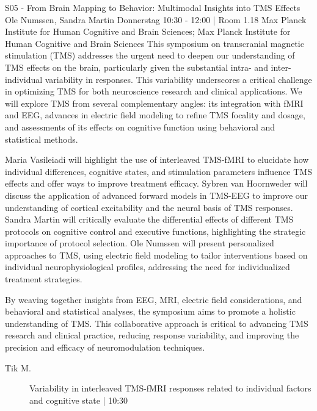 
            \begin{symposium}
            {S05 - From Brain Mapping to Behavior: Multimodal Insights into TMS Effects}
            { Ole Numssen, Sandra Martin}
            {Donnerstag 10:30 - 12:00 | Room 1.18}
            {Max Planck Institute for Human Cognitive and Brain Sciences; Max Planck Institute for Human Cognitive and Brain Sciences}
            This symposium on transcranial magnetic stimulation (TMS) addresses the urgent need to deepen our understanding of TMS effects on the brain, particularly given the substantial intra- and inter-individual variability in responses. This variability underscores a critical challenge in optimizing TMS for both neuroscience research and clinical applications. We will explore TMS from several complementary angles: its integration with fMRI and EEG, advances in electric field modeling to refine TMS focality and dosage, and assessments of its effects on cognitive function using behavioral and statistical methods.

Maria Vasileiadi will highlight the use of interleaved TMS-fMRI to elucidate how individual differences, cognitive states, and stimulation parameters influence TMS effects and offer ways to improve treatment efficacy. Sybren van Hoornweder will discuss the application of advanced forward models in TMS-EEG to improve our understanding of cortical excitability and the neural basis of TMS responses. Sandra Martin will critically evaluate the differential effects of different TMS protocols on cognitive control and executive functions, highlighting the strategic importance of protocol selection. Ole Numssen will present personalized approaches to TMS, using electric field modeling to tailor interventions based on individual neurophysiological profiles, addressing the need for individualized treatment strategies.

By weaving together insights from EEG, MRI, electric field considerations, and behavioral and statistical analyses, the symposium aims to promote a holistic understanding of TMS. This collaborative approach is critical to advancing TMS research and clinical practice, reducing response variability, and improving the precision and efficacy of neuromodulation techniques.
            \begin{description}    
            
                \item [ Tik M.] Variability in interleaved TMS­-fMRI responses related to individual factors and cognitive state \textcolor{mygray}{ | 10:30}    
                

\end{description}
\end{symposium}
